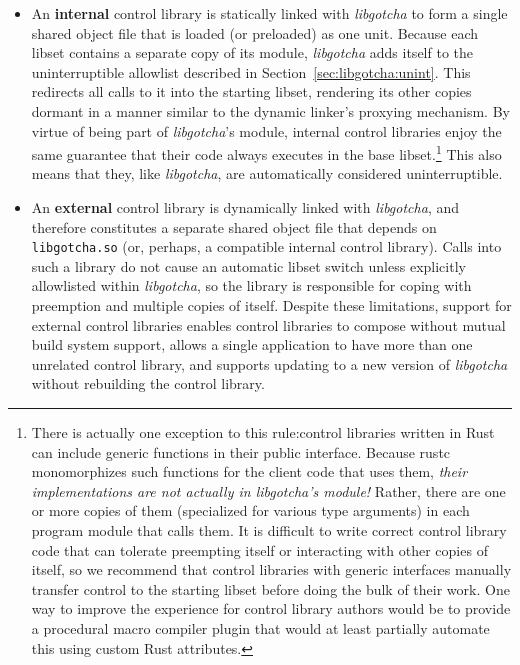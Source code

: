 \begin{itemize}
\item An \textbf{internal} control library is statically linked with
	\textit{libgotcha} to form a single shared object file that is loaded (or
	preloaded) as one unit.  Because each libset contains a separate copy of
	its module, \textit{libgotcha} adds itself to the uninterruptible allowlist
	described in Section~\ref{sec:libgotcha:unint}.  This redirects all calls to
	it into the starting libset, rendering its other copies dormant in a manner
	similar to the dynamic linker's proxying mechanism.  By virtue of being part
	of \textit{libgotcha}'s module, internal control libraries enjoy the same
	guarantee that their code always executes in the base libset.\footnote{There
	is actually one exception to this rule:\@ control libraries written in Rust
	can include generic functions in their public interface.  Because rustc
	monomorphizes such functions for the client code that uses them,
	\textit{their implementations are not actually in \textrm{libgotcha}'s
	module!}  Rather, there are one or more copies of them (specialized for
	various type arguments) in each program module that calls them.  It is
	difficult to write correct control library code that can tolerate preempting
	itself or interacting with other copies of itself, so we recommend that
	control libraries with generic interfaces manually transfer control to the
	starting libset before doing the bulk of their work.  One way to improve the
	experience for control library authors would be to provide a procedural macro
	compiler plugin that would at least partially automate this using custom Rust
	attributes.}  This also means that
	they, like \textit{libgotcha}, are automatically considered uninterruptible.
\item An \textbf{external} control library is dynamically linked with
	\textit{libgotcha}, and therefore constitutes a separate shared object file
	that depends on \texttt{libgotcha.so} (or, perhaps, a compatible internal
	control library).  Calls into such a library do not cause an automatic libset
	switch unless explicitly allowlisted within \textit{libgotcha}, so the
	library is responsible for coping with preemption and multiple copies of
	itself.  Despite these limitations, support for external control libraries
	enables control libraries to compose without mutual build system support,
	allows a single application to have more than one unrelated control library,
	and supports updating to a new version of \textit{libgotcha} without
	rebuilding the control library.
\end{itemize}


